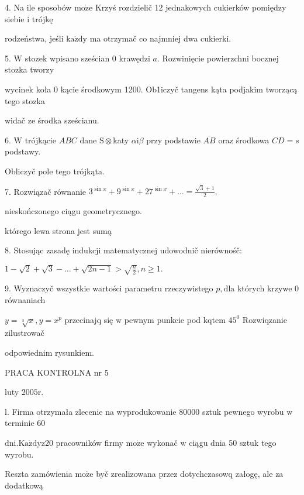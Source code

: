 \documentclass[a4paper,12pt]{article}
\begin{document}
4. Na ile sposobów $\mathrm{m}\mathrm{o}\dot{\mathrm{z}}\mathrm{e}$ Krzyś rozdzielič 12 jednakowych cukierków pomiędzy siebie $\mathrm{i}$ trójkę

rodzeństwa, jeśli $\mathrm{k}\mathrm{a}\dot{\mathrm{z}}\mathrm{d}\mathrm{y}$ ma otrzymač co najmniej dwa cukierki.

5. $\mathrm{W}$ stozek wpisano sześcian $0$ krawędzi $a$. Rozwinięcie powierzchni bocznej stozka tworzy

wycinek koła $0$ kącie środkowym 1200. Ob1iczyč tangens kąta podjakim tworzącą tego stozka

widač ze środka sześcianu.

6. $\mathrm{W}$ trójkącie $ABC$ dane $\mathrm{S}\otimes$katy $\alpha \mathrm{i}\beta$ przy podstawie $\overline{AB}$ oraz środkowa $CD=s$ podstawy.

Obliczyč pole tego trójkąta.

7. Rozwiązač równanie $3^{\sin x}+9^{\sin x}+27^{\sin x}+\ldots= \displaystyle \frac{\sqrt{3}+1}{2},$

nieskończonego ciągu geometrycznego.

którego lewa strona jest sumą

8. Stosując zasadę indukcji matematycznej udowodnič nierównośč:

$1-\sqrt{2}+\sqrt{3}-\ldots+\sqrt{2n-1}>\sqrt{\frac{n}{2}},n\geq 1.$

9. Wyznaczyč wszystkie wartości parametru rzeczywistego $p, \mathrm{d}\mathrm{l}\mathrm{a}$ których krzywe $0$ równaniach

$y=\sqrt[3]{x}, y=x^{p}$ przecinajq się $\mathrm{w}$ pewnym punkcie pod kqtem $45^{0}$ Rozwiqzanie zilustrowač

odpowiednim rysunkiem.





PRACA KONTROLNA nr 5

luty $2005\mathrm{r}.$

l. Firma otrzymała zlecenie na wyprodukowanie 80000 sztuk pewnego wyrobu $\mathrm{w}$ terminie 60

$\mathrm{d}\mathrm{n}\mathrm{i}. \mathrm{K}\mathrm{a}\dot{\mathrm{z}}\mathrm{d}\mathrm{y} \mathrm{z} 20$ pracowników firmy $\mathrm{m}\mathrm{o}\dot{\mathrm{z}}\mathrm{e}$ wykonač $\mathrm{w}$ ciągu dnia 50 sztuk tego wyrobu.

Reszta zamówienia $\mathrm{m}\mathrm{o}\dot{\mathrm{z}}\mathrm{e}$ byč zrealizowana przez dotychczasowq załogę, ale za dodatkową
\end{document}
